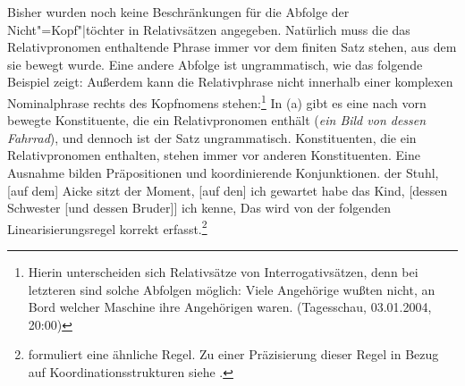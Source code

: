 Bisher wurden noch keine Beschränkungen
für die Abfolge der Nicht"=Kopf"|töchter in Relativsätzen angegeben. Natürlich muss die das
Relativpronomen enthaltende Phrase immer vor dem finiten Satz stehen, aus dem sie bewegt wurde. Eine
andere Abfolge ist ungrammatisch, wie das folgende Beispiel zeigt:
\z
Außerdem kann die Relativphrase nicht innerhalb einer komplexen
Nominalphrase rechts des Kopfnomens stehen:\footnote{
  Hierin unterscheiden sich Relativsätze von Interrogativsätzen,
  denn bei letzteren sind solche Abfolgen möglich:
\ea
Viele Angehörige wußten nicht, an Bord welcher Maschine ihre Angehörigen waren.
  (Tagesschau, 03.01.2004, 20:00)
\z
}
\eal
{}
\zl
In (a) gibt es eine nach vorn bewegte Konstituente, die ein Relativpronomen enthält 
(\emph{ein Bild von dessen Fahrrad}), und dennoch ist der Satz ungrammatisch.
Konstituenten, die ein Relativpronomen enthalten, stehen immer vor anderen Konstituenten.
Eine Ausnahme bilden Präpositionen 
und koordinierende Konjunktionen.
\eal
\ex der Stuhl, [auf dem] Aicke sitzt
\ex der Moment, [auf den] ich gewartet habe
\zl
\ea
das Kind, [dessen Schwester [und dessen Bruder]] ich kenne,
\z
Das wird von der folgenden Linearisierungsregel korrekt erfasst.\footnote{
        \citet*{Riemsdijk85} 
        formuliert eine ähnliche Regel. Zu einer Präzisierung dieser
        Regel in Bezug auf Koordinationsstrukturen siehe .%
}
